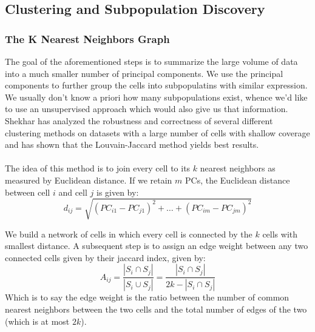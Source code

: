 \subsection{Clustering and Subpopulation Discovery}
\subsubsection{The K Nearest Neighbors Graph}
The goal of the aforementioned steps is to summarize the large volume of data into a much smaller number of principal components. We use the principal components to further group the cells into subpopulatins with similar expression. We usually don't know a priori how many subpopulations exist, whence we'd like to use an unsupervised approach which would also give us that information. Shekhar\cite{shekhar2016comprehensive} has analyzed the robustness and correctness of several different clustering methods on datasets with a large number of cells with shallow coverage and has shown that the Louvain-Jaccard method yields best results. \\
\\
The idea of this method is to join every cell to its $k$ nearest neighbors as measured by Euclidean distance. If we retain $m$ PCs, the Euclidean distance between cell $i$ and cell $j$ is given by:
$$
d_{ij} = \sqrt{(PC_{i1} - PC_{j1})^2 + \dots + (PC_{im} - PC_{jm})^2}
$$

We build a network of cells in which every cell is connected by the $k$ cells with smallest distance. A subsequent step is to assign an edge weight between any two connected cells given by their jaccard index, given by:
$$
A_{ij} = \frac{|S_i \cap S_j|}{|S_i \cup S_j|} = \frac{|S_i \cap S_j|}{2k - |S_i \cap S_j |}
$$
Which is to say the edge weight is the ratio between the number of common nearest neighbors between the two cells and the total number of edges of the two (which is at most $2k$). 

